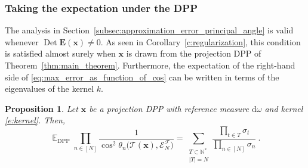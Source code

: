 \documentclass[twoside,11pt]{book}
\newtheorem{proposition}{Proposition}
\DeclareMathOperator{\Det}{Det}
\DeclareMathOperator{\DPP}{\mathrm{DPP}}
\DeclareMathOperator{\EX}{\mathbb{E}}
\begin{document}
\subsubsection{Taking the expectation under the DPP}
\label{subsec:expectation_under_the_DPP}
The analysis in Section~\ref{subsec:approximation_error_principal_angle} is valid whenever $\Det \bm{E}(\bm{x}) \neq 0$. As seen in Corollary~\ref{c:regularization}, this condition is satisfied almost surely when $\bm{x}$ is drawn from the projection DPP of Theorem~\ref{thm:main_theorem}. Furthermore, the expectation of the right-hand side of \eqref{eq:max_error_as_function_of_cos} can be written in terms of the eigenvalues of the kernel $k$.
\begin{proposition}\label{prop:expected_value_of_product_of_cos}
Let $\bm{x}$ be a projection DPP with reference measure $\mathrm{d}\omega$ and kernel \eqref{e:kernel}. Then,
\begin{equation}\label{eq:expected_value_of_product_of_cos}
\EX_{\DPP} \prod\limits_{n \in [N]} \frac{1}{\cos^{2} \theta_{n}\bigg(\mathcal{T}(\bm{x}), \mathcal{E}^{\mathcal{F}}_{N} \bigg)}   = \sum\limits_{\substack{T \subset \mathbb{N}^{*} \\ |T| = N}} \frac{ \prod\limits_{t \in T}\sigma_{t}}{\prod\limits_{n \in [N]} \sigma_{n}} \:.
\end{equation}
\end{proposition}

\end{document}

